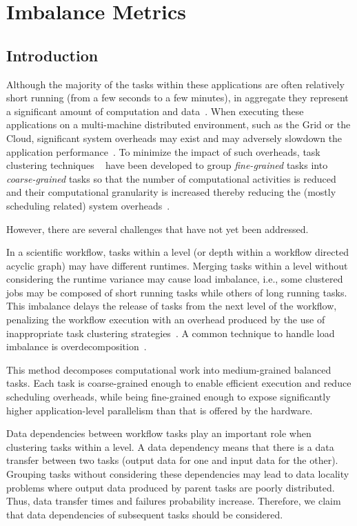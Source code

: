 

\section{Imbalance Metrics}
\label{sec:imbalance}

\subsection{Introduction}

Although the majority of the tasks within these applications are often relatively short running (from a few seconds to a few minutes), in aggregate they represent a significant amount of computation and data~\cite{LIGO}. When executing these applications on a multi-machine distributed environment, such as the Grid or the Cloud, significant system overheads may exist and may adversely slowdown the application performance~\cite{Chen}. To minimize the impact of such overheads, task clustering techniques
~\cite{Muthuvelu:2005:DJG:1082290.1082297, 4493929, Muthuvelu2010, Muthuvelu2013170, keat-2006, ang-2009, 4958835, Silva2013} have been developed to group \emph{fine-grained} tasks into \emph{coarse-grained} tasks so that the number of computational activities is reduced and their computational granularity is increased thereby reducing the (mostly scheduling related) system overheads~\cite{Chen}.

However, there are several challenges that have not yet been addressed.

In a scientific workflow, tasks within a level (or depth within a workflow directed acyclic graph) may have different runtimes. Merging tasks within a level without considering the runtime variance may cause load imbalance, i.e., some clustered jobs may be composed of short running tasks while others of long running tasks. This imbalance delays the release of tasks from the next level of the workflow, penalizing the workflow execution with an overhead produced by the use of inappropriate task clustering strategies~\cite{Chen2013}.
A common technique to handle load imbalance is overdecomposition~\cite{Lifflander}.

This method decomposes computational work into medium-grained balanced tasks. Each task is coarse-grained enough to enable efficient execution and reduce scheduling overheads, while being fine-grained enough to expose significantly higher application-level parallelism than that is offered by the hardware. 

Data dependencies between workflow tasks play an important role when clustering tasks within a level. A data dependency means that there is a data transfer between two tasks (output data for one and input data for the other). Grouping tasks without considering these dependencies may lead to data locality problems where output data produced by parent tasks are poorly distributed. Thus, data transfer times and failures probability increase.
Therefore, we claim that data dependencies of subsequent tasks should be considered.

